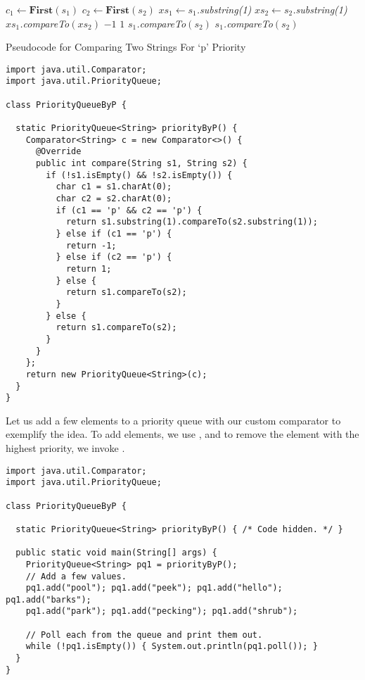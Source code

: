 \begin{algorithm}[H]
\begin{algorithmic}
        \State $c_1 \gets \textbf{First}(s_1)$
        \State $c_2 \gets \textbf{First}(s_2)$
            \State $xs_1 \gets s_1$\emph{.substring(1)}
            \State $xs_2 \gets s_2$\emph{.substring(1)}
            \State \Return $xs_1$\emph{.compareTo}$(xs_2)$
            \State \Return $-1$
            \State \Return $1$
        \Else
            \State \Return $s_1$\emph{.compareTo}$(s_2)$
        \EndIf
    \Else
        \State \Return $s_1$\emph{.compareTo}$(s_2)$
    \EndIf
\EndProcedure
\end{algorithmic}
\caption{Pseudocode for Comparing Two Strings For `p' Priority}
\label{alg:pseudocodepriority}
\end{algorithm}

\begin{lstlisting}[language=MyJava]
import java.util.Comparator;
import java.util.PriorityQueue;

class PriorityQueueByP {

  static PriorityQueue<String> priorityByP() {
    Comparator<String> c = new Comparator<>() {
      @Override
      public int compare(String s1, String s2) {
        if (!s1.isEmpty() && !s2.isEmpty()) {
          char c1 = s1.charAt(0);
          char c2 = s2.charAt(0);
          if (c1 == 'p' && c2 == 'p') {
            return s1.substring(1).compareTo(s2.substring(1));
          } else if (c1 == 'p') {
            return -1;
          } else if (c2 == 'p') {
            return 1;
          } else {
            return s1.compareTo(s2);
          }
        } else {
          return s1.compareTo(s2);
        }
      }
    };
    return new PriorityQueue<String>(c);
  }
}
\end{lstlisting}

Let us add a few elements to a priority queue with our custom comparator to exemplify the idea. To add elements, we use , and to remove the element with the highest priority, we invoke .

\begin{lstlisting}[language=MyJava]
import java.util.Comparator;
import java.util.PriorityQueue;

class PriorityQueueByP {

  static PriorityQueue<String> priorityByP() { /* Code hidden. */ }

  public static void main(String[] args) {
    PriorityQueue<String> pq1 = priorityByP();
    // Add a few values.
    pq1.add("pool"); pq1.add("peek"); pq1.add("hello"); pq1.add("barks");
    pq1.add("park"); pq1.add("pecking"); pq1.add("shrub");

    // Poll each from the queue and print them out.
    while (!pq1.isEmpty()) { System.out.println(pq1.poll()); }
  }
}
\end{lstlisting}

